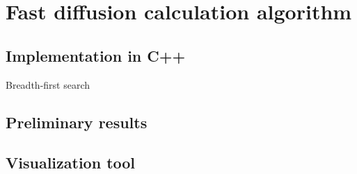 \documentclass[main]{subfiles}
\begin{document}

\section{Fast diffusion calculation algorithm}

\subsection{Implementation in C++}

Breadth-first search

\subsection{Preliminary results}

\subsection{Visualization tool}

\end{document}
